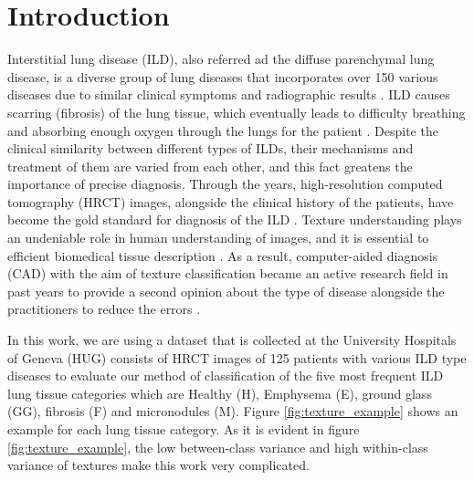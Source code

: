 \documentclass[conference]{IEEEtran}
\begin{document}
\section{\large{Introduction}}
Interstitial lung disease (ILD), also referred ad the diffuse parenchymal lung disease, is a diverse group of lung diseases that incorporates over 150 various diseases due to similar clinical symptoms and radiographic results \cite{ILD_intro1}. ILD causes scarring (fibrosis) of the lung tissue, which eventually leads to difficulty breathing and absorbing enough oxygen through the lungs for the patient \cite{ILD_intro2}. Despite the clinical similarity between different types of ILDs, their mechanisms and treatment of them are varied from each other, and this fact greatens the importance of precise diagnosis\cite{dataset}. Through the years, high-resolution computed tomography (HRCT) images, alongside the clinical history of the patients, have become the gold standard for diagnosis of the ILD \cite{dataset}. Texture understanding plays an undeniable role in human understanding of images, and it is essential to efficient biomedical tissue description \cite{ILD_intro3}. As a result, computer-aided diagnosis (CAD) with the aim of texture classification became an active research field in past years to provide a second opinion about the type of disease alongside the practitioners to reduce the errors \cite{ILD_intro4}.

In this work, we are using a dataset that is collected at the University Hospitals of Geneva (HUG) \cite{dataset} consists of HRCT images of 125 patients with various ILD type diseases to evaluate our method of classification of the five most frequent ILD lung tissue categories which are Healthy (H), Emphysema (E), ground glass (GG), fibrosis (F) and micronodules (M). Figure \ref{fig:texture_example} shows an example for each lung tissue category. As it is evident in figure \ref{fig:texture_example}, the low between-class variance and high within-class variance of textures make this work very complicated.
\end{document}
